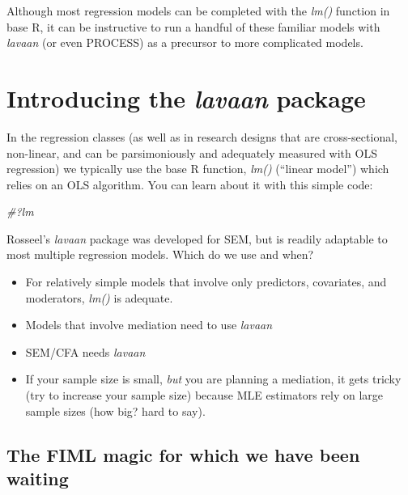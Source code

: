 \documentclass[
  11pt,
]{book}
\newenvironment{Shaded}{\begin{snugshade}}{\end{snugshade}}
\newcommand{\CommentTok}[1]{\textcolor[rgb]{0.37,0.37,0.37}{\textit{#1}}}
\providecommand{\tightlist}{%
  \setlength{\itemsep}{0pt}\setlength{\parskip}{0pt}}
\begin{document}
Although most regression models can be completed with the \emph{lm()} function in base R, it can be instructive to run a handful of these familiar models with \emph{lavaan} (or even PROCESS) as a precursor to more complicated models.

\hypertarget{introducing-the-lavaan-package}{%
\section{\texorpdfstring{Introducing the \emph{lavaan} package}{Introducing the lavaan package}}\label{introducing-the-lavaan-package}}

In the regression classes (as well as in research designs that are cross-sectional, non-linear, and can be parsimoniously and adequately measured with OLS regression) we typically use the base R function, \emph{lm()} (``linear model'') which relies on an OLS algorithm. You can learn about it with this simple code:

\begin{Shaded}
\begin{Highlighting}[]
\CommentTok{\#?lm}
\end{Highlighting}
\end{Shaded}

Rosseel's \citeyearpar{rosseel_lavaan_2020} \emph{lavaan} package was developed for SEM, but is readily adaptable to most multiple regression models. Which do we use and when?

\begin{itemize}
\tightlist
\item
  For relatively simple models that involve only predictors, covariates, and moderators, \emph{lm()} is adequate.
\item
  Models that involve mediation need to use \emph{lavaan}
\item
  SEM/CFA needs \emph{lavaan}
\item
  If your sample size is small, \emph{but} you are planning a mediation, it gets tricky (try to increase your sample size) because MLE estimators rely on large sample sizes (how big? hard to say).
\end{itemize}

\hypertarget{the-fiml-magic-for-which-we-have-been-waiting}{%
\subsection{The FIML magic for which we have been waiting}\label{the-fiml-magic-for-which-we-have-been-waiting}}
\end{document}

